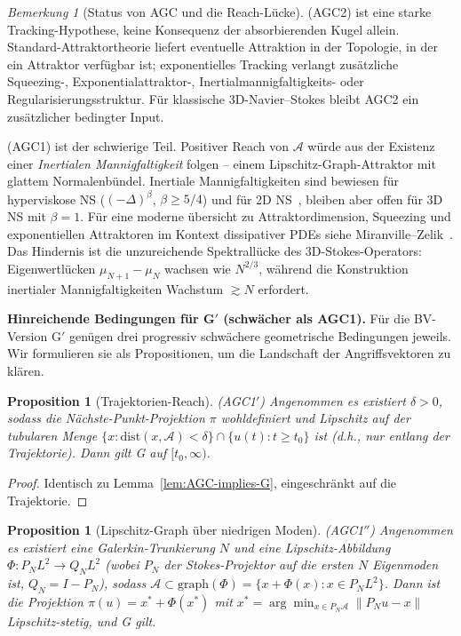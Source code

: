 \documentclass[12pt,a4paper]{article}
\theoremstyle{definition}
\theoremstyle{plain}
\newtheorem{proposition}[definition]{Proposition}
\theoremstyle{remark}
\newtheorem{remark}[definition]{Bemerkung}
\begin{document}
\begin{remark}[Status von AGC und die Reach-Lücke]
\label{rem:AGC-status}
\textup{(AGC2)} ist eine starke Tracking-Hypothese, keine Konsequenz
der absorbierenden Kugel allein. Standard-Attraktortheorie liefert
eventuelle Attraktion in der Topologie, in der ein Attraktor verfügbar
ist; exponentielles Tracking verlangt zusätzliche Squeezing-,
Exponentialattraktor-, Inertialmannigfaltigkeits- oder
Regularisierungsstruktur. Für klassische 3D-Navier--Stokes bleibt
AGC2 ein zusätzlicher bedingter Input.

\textup{(AGC1)} ist der schwierige Teil.
Positiver Reach von $\mathcal{A}$ würde aus der Existenz einer
\emph{Inertialen Mannigfaltigkeit} folgen -- einem Lipschitz-Graph-Attraktor mit glattem
Normalenbündel. Inertiale Mannigfaltigkeiten sind bewiesen für hyperviskose NS
($(-\Delta)^\beta$, $\beta \ge 5/4$) und für 2D
NS~\cite{MalletParetSell1988,EdenFoiasNicolaenko1994}, bleiben aber offen für 3D NS mit $\beta=1$.
Für eine moderne übersicht zu Attraktordimension, Squeezing und exponentiellen
Attraktoren im Kontext dissipativer PDEs siehe Miranville--Zelik~\cite{MiranvilleZelik2008}.
Das Hindernis ist die unzureichende Spektrallücke des 3D-Stokes-Operators:
Eigenwertlücken $\mu_{N+1} - \mu_N$ wachsen wie $N^{2/3}$, während
die Konstruktion inertialer Mannigfaltigkeiten Wachstum $\gtrsim N$ erfordert.

\medskip\noindent
\textbf{Hinreichende Bedingungen für G$'$ (schwächer als AGC1).}\;
Für die BV-Version G$'$ genügen drei progressiv schwächere geometrische
Bedingungen jeweils. Wir formulieren sie als Propositionen, um die
Landschaft der Angriffsvektoren zu klären.

\begin{proposition}[Trajektorien-Reach]\label{prop:traj-reach}
\textup{(AGC1$'$)}\;
Angenommen es existiert $\delta > 0$, sodass die Nächste-Punkt-Projektion
$\pi$ wohldefiniert und Lipschitz auf der tubularen Menge
$\{x : \mathrm{dist}(x, \mathcal{A}) < \delta\}
\cap \{u(t) : t \ge t_0\}$
ist \textup{(}d.h., nur entlang der Trajektorie\textup{)}. Dann gilt G
auf $[t_0, \infty)$.
\end{proposition}

\begin{proof}
Identisch zu Lemma~\ref{lem:AGC-implies-G}, eingeschränkt auf die
Trajektorie.
\end{proof}

\begin{proposition}[Lipschitz-Graph über niedrigen Moden]\label{prop:graph}
\textup{(AGC1$''$)}\;
Angenommen es existiert eine Galerkin-Trunkierung $N$ und eine Lipschitz-Abbildung
$\Phi : P_N L^2 \to Q_N L^2$ (wobei $P_N$ der Stokes-Projektor
auf die ersten $N$ Eigenmoden ist, $Q_N = I - P_N$), sodass
$\mathcal{A} \subset \mathrm{graph}(\Phi) =
\{x + \Phi(x) : x \in P_N L^2\}$.
Dann ist die Projektion $\pi(u) = x^* + \Phi(x^*)$ mit
$x^* = \arg\min_{x \in P_N\mathcal{A}} \|P_N u - x\|$ Lipschitz-stetig,
und G gilt.
\end{proposition}


\end{remark}
\end{document}
